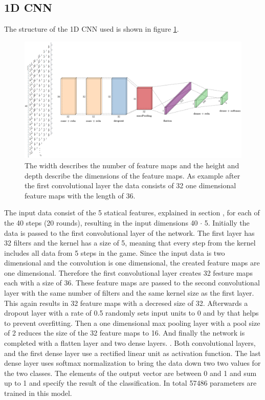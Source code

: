 \subsection{1D CNN}
The structure of the 1D CNN used is shown in figure \ref{fig:1dCnnStructure}.
\begin{figure}[H]
	\centering
	\includegraphics[width=15cm]{images/1dCnnStructureChanged.png}
	\caption[Bild kurz]{The width describes the number of feature maps and the height and depth describe the dimensions of the feature maps. As example after the first convolutional layer the data consists of 32 one dimensional feature maps with the length of 36.}
	\label{fig:1dCnnStructure}
\end{figure}
The input data consist of the 5 statical features, explained in section , for each of the 40 steps (20 rounds), resulting in the input dimensions 40 $\cdot$ 5. Initially the data is passed to the first convolutional layer of the network. The first layer has 32 filters and the kernel has a size of 5, meaning that every step from the kernel includes all data from 5 steps in the game. Since the input data is two dimensional and the convolution is one dimensional, the created feature maps are one dimensional. Therefore the first convolutional layer creates 32 festure maps each with a size of 36. These feature maps are passed to the second convolutional layer with the same number of filters and the same kernel size as the first layer. This again results in 32 feature maps with a decresed size of 32. Afterwards a dropout layer with a rate of 0.5 randomly sets input units to 0 and by that helps to prevent overfitting. Then a one dimensional max pooling layer with a pool size of 2 reduces the size of the 32 feature maps to 16.  And finally the network is completed with a flatten layer and two dense layers. . Both convolutional layers, and the first dense layer use a rectified linear unit as activation function. The last dense layer uses softmax normalization to bring the data down two two values for the two classes. The elements of the output vector are between 0 and 1 and sum up to 1 and specify the result of the classification. In total 57486 parameters are trained in this model. 

